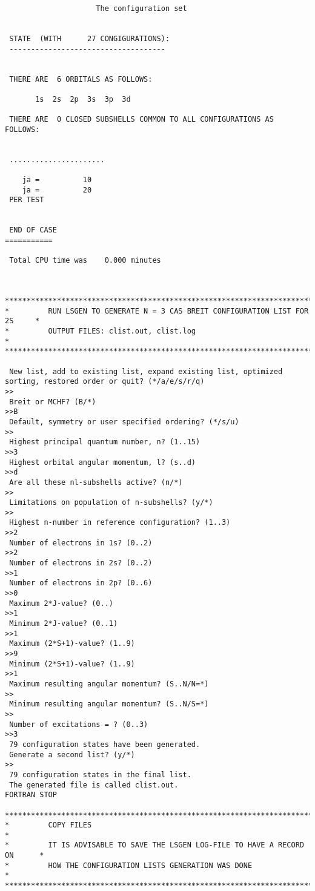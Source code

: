 \documentclass[fleqn,10pt]{book}
\begin{document}
\begin{verbatim}
                     The configuration set


 STATE  (WITH      27 CONGIGURATIONS):
 ------------------------------------


 THERE ARE  6 ORBITALS AS FOLLOWS:

       1s  2s  2p  3s  3p  3d

 THERE ARE  0 CLOSED SUBSHELLS COMMON TO ALL CONFIGURATIONS AS FOLLOWS:


 ......................

    ja =          10
    ja =          20
 PER TEST


 END OF CASE
===========

 Total CPU time was    0.000 minutes



*******************************************************************************
*         RUN LSGEN TO GENERATE N = 3 CAS BREIT CONFIGURATION LIST FOR 2S     *
*         OUTPUT FILES: clist.out, clist.log                                  *
*******************************************************************************

 New list, add to existing list, expand existing list, optimized sorting, restored order or quit? (*/a/e/s/r/q)
>>
 Breit or MCHF? (B/*)
>>B
 Default, symmetry or user specified ordering? (*/s/u)
>>
 Highest principal quantum number, n? (1..15)
>>3
 Highest orbital angular momentum, l? (s..d)
>>d
 Are all these nl-subshells active? (n/*)
>>
 Limitations on population of n-subshells? (y/*)
>>
 Highest n-number in reference configuration? (1..3)
>>2
 Number of electrons in 1s? (0..2)
>>2
 Number of electrons in 2s? (0..2)
>>1
 Number of electrons in 2p? (0..6)
>>0
 Maximum 2*J-value? (0..)
>>1
 Minimum 2*J-value? (0..1)
>>1
 Maximum (2*S+1)-value? (1..9)
>>9
 Minimum (2*S+1)-value? (1..9)
>>1
 Maximum resulting angular momentum? (S..N/N=*)
>>
 Minimum resulting angular momentum? (S..N/S=*)
>>
 Number of excitations = ? (0..3)
>>3
 79 configuration states have been generated.
 Generate a second list? (y/*)
>>
 79 configuration states in the final list.
 The generated file is called clist.out.
FORTRAN STOP

*******************************************************************************
*         COPY FILES                                                          *
*         IT IS ADVISABLE TO SAVE THE LSGEN LOG-FILE TO HAVE A RECORD ON      *
*         HOW THE CONFIGURATION LISTS GENERATION WAS DONE                     *
*******************************************************************************


\end{verbatim}
\end{document}
